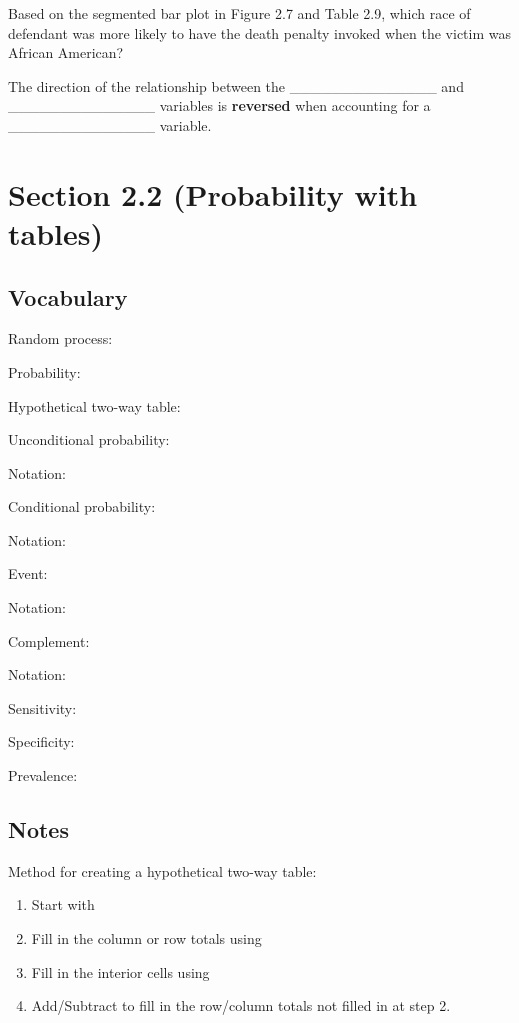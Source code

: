 \documentclass[
]{report}
\newcommand{\rgs}{\vspace{12pt}} %
\newcommand{\rgi}{\hspace{24pt}}  %
\begin{document}
Based on the segmented bar plot in Figure 2.7 and Table 2.9, which race of defendant was more likely to have the death penalty invoked when the victim was African American?
\rgs

The direction of the relationship between the \_\_\_\_\_\_\_\_\_\_\_\_\_\_
and \_\_\_\_\_\_\_\_\_\_\_\_\_\_ variables is \textbf{reversed} when accounting for
a \_\_\_\_\_\_\_\_\_\_\_\_\_\_ variable.
\rgs

\hypertarget{section-2.2-probability-with-tables}{%
\section*{Section 2.2 (Probability with tables)}\label{section-2.2-probability-with-tables}}

\hypertarget{vocabulary-1}{%
\subsection*{Vocabulary}\label{vocabulary-1}}

Random process:
\rgs

Probability:
\rgs

Hypothetical two-way table:
\rgs

Unconditional probability:
\rgs

\rgi Notation:
\rgs

Conditional probability:
\rgs

\rgi Notation:
\rgs

Event:
\rgs

\rgi Notation:
\rgs

Complement:
\rgs

\rgi Notation:
\rgs

Sensitivity:
\rgs

Specificity:
\rgs

Prevalence:
\rgs

\hypertarget{notes-2}{%
\subsection*{Notes}\label{notes-2}}

Method for creating a hypothetical two-way table:

\begin{enumerate}
\def\labelenumi{\arabic{enumi}.}
\item
  Start with
  \rgs
\item
  Fill in the column or row totals using
  \rgs
\item
  Fill in the interior cells using
  \rgs
\item
  Add/Subtract to fill in the row/column totals not filled in at step 2.
\end{enumerate}
\end{document}
